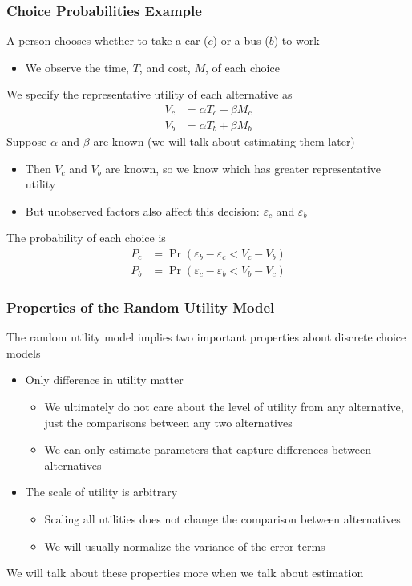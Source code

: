 \documentclass{beamer}\usepackage[]{graphicx}\usepackage[]{color}
\begin{document}
\begin{frame}\frametitle{Choice Probabilities Example}
    A person chooses whether to take a car ($c$) or a bus ($b$) to work
    \begin{itemize}
    	\item We observe the time, $T$, and cost, $M$, of each choice
    \end{itemize}
    \vspace{1ex}
    We specify the representative utility of each alternative as
    \begin{align*}
    	V_c &= \alpha T_c + \beta M_c \\
    	V_b &= \alpha T_b + \beta M_b
    \end{align*}
    Suppose $\alpha$ and $\beta$ are known (we will talk about estimating them later)
    \begin{itemize}
    	\item Then $V_c$ and $V_b$ are known, so we know which has greater representative utility
    	\item But unobserved factors also affect this decision: $\varepsilon_c$ and $\varepsilon_b$
    \end{itemize}
    \vspace{2ex}
    The probability of each choice is
    \begin{align*}
    	P_c &= \Pr(\varepsilon_b - \varepsilon_c < V_c - V_b) \\
    	P_b &= \Pr(\varepsilon_c - \varepsilon_b < V_b - V_c)
    \end{align*}
\end{frame}

\begin{frame}\frametitle{Properties of the Random Utility Model}
    The random utility model implies two important properties about discrete choice models
    \begin{itemize}
    	\item Only difference in utility matter
    	\begin{itemize}
    		\item We ultimately do not care about the level of utility from any alternative, just the comparisons between any two alternatives
    		\item We can only estimate parameters that capture differences between alternatives
    	\end{itemize}
    	\item The scale of utility is arbitrary
    	\begin{itemize}
    		\item Scaling all utilities does not change the comparison between alternatives
    		\item We will usually normalize the variance of the error terms 
    	\end{itemize}
    \end{itemize}
    \vspace{3ex}
    We will talk about these properties more when we talk about estimation
\end{frame}
\end{document}
